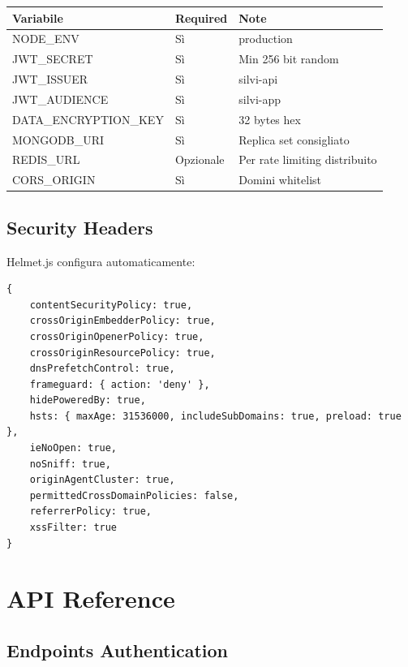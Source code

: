 \documentclass[12pt,a4paper]{report}
\begin{document}
\begin{longtable}{@{}lll@{}}
\toprule
\textbf{Variabile} & \textbf{Required} & \textbf{Note} \\
\midrule
\endhead
NODE\_ENV & Sì & production \\
JWT\_SECRET & Sì & Min 256 bit random \\
JWT\_ISSUER & Sì & silvi-api \\
JWT\_AUDIENCE & Sì & silvi-app \\
DATA\_ENCRYPTION\_KEY & Sì & 32 bytes hex \\
MONGODB\_URI & Sì & Replica set consigliato \\
REDIS\_URL & Opzionale & Per rate limiting distribuito \\
CORS\_ORIGIN & Sì & Domini whitelist \\
\bottomrule
\end{longtable}

\section{Security Headers}

Helmet.js configura automaticamente:

\begin{lstlisting}[caption={Helmet Configuration}]
{
    contentSecurityPolicy: true,
    crossOriginEmbedderPolicy: true,
    crossOriginOpenerPolicy: true,
    crossOriginResourcePolicy: true,
    dnsPrefetchControl: true,
    frameguard: { action: 'deny' },
    hidePoweredBy: true,
    hsts: { maxAge: 31536000, includeSubDomains: true, preload: true },
    ieNoOpen: true,
    noSniff: true,
    originAgentCluster: true,
    permittedCrossDomainPolicies: false,
    referrerPolicy: true,
    xssFilter: true
}
\end{lstlisting}

\appendix
\chapter{API Reference}

\section{Endpoints Authentication}
\end{document}
